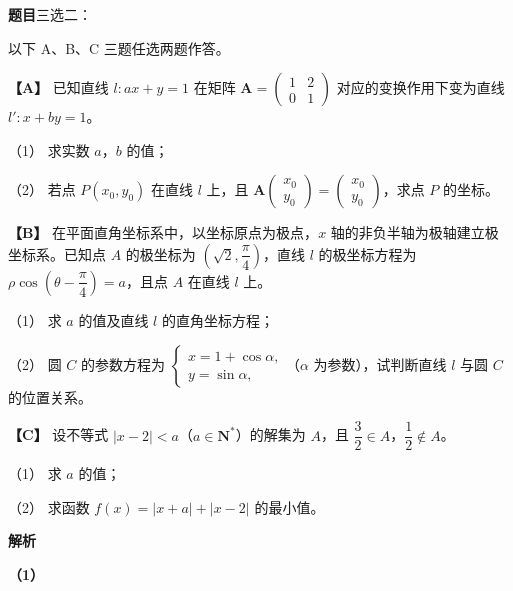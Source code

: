 \begin{answer}

\textbf{题目}三选二：

以下 A、B、C 三题任选两题作答。

\textbf{【A】} 已知直线 $l:ax+y=1$ 在矩阵 $\boldsymbol A=\begin{pmatrix}1&2\\0&1\end{pmatrix}$ 对应的变换作用下变为直线 $l':x+by=1$。

（1） 求实数 $a$，$b$ 的值；

（2） 若点 $P(x_0,y_0)$ 在直线 $l$ 上，且 $\boldsymbol A\begin{pmatrix}x_0\\y_0\end{pmatrix}=\begin{pmatrix}x_0\\y_0\end{pmatrix}$，求点 $P$ 的坐标。

\textbf{【B】} 在平面直角坐标系中，以坐标原点为极点，$x$ 轴的非负半轴为极轴建立极坐标系。已知点 $A$ 的极坐标为 $\left(\sqrt2,\dfrac\pi4\right)$，直线 $l$ 的极坐标方程为 $\rho\cos\left(\theta-\dfrac\pi4\right)=a$，且点 $A$ 在直线 $l$ 上。

（1） 求 $a$ 的值及直线 $l$ 的直角坐标方程；

（2） 圆 $C$ 的参数方程为 $\begin{cases}x=1+\cos\alpha,\\y=\sin\alpha,\end{cases}$（$\alpha$ 为参数），试判断直线 $l$ 与圆 $C$ 的位置关系。

\textbf{【C】} 设不等式 $|x-2|<a$（$a\in\mathbf N^*$）的解集为 $A$，且 $\dfrac32\in A$，$\dfrac12\notin A$。

（1） 求 $a$ 的值；

（2） 求函数 $f(x)=|x+a|+|x-2|$ 的最小值。

\textbf{解析}


\textbf{（1）}


\end{answer}

